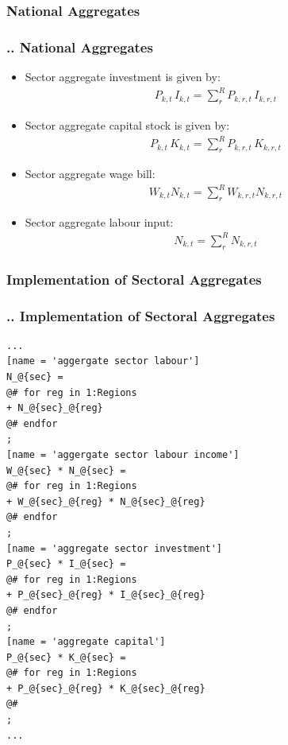 \documentclass[11pt,aspectratio=169]{beamer}
\begin{document}
\subsubsection{National Aggregates}
\begin{frame}
\frametitle{{\thesection.\thesubsection.\thesubsubsection} National Aggregates}
\scriptsize
\begin{itemize}
\item Sector aggregate investment is given by:
\begin{align*}
P_{k,t} \, I_{k,t} = \sum_{r}^{R} P_{k,r,t} \, I_{k,r,t}
\end{align*}
\item Sector aggregate capital stock is given by:
\begin{align*}
P_{k,t} \, K_{k,t} = \sum_{r}^{R} P_{k,r,t} \, K_{k,r,t}
\end{align*}
\item Sector aggregate wage bill:
\begin{align*}
W_{k,t} N_{k,t} = \sum_{r}^{R}  W_{k,r,t} N_{k,r,t}
\end{align*}
\item Sector aggregate labour input:
\begin{align*}
N_{k,t} = \sum_{r}^{R} N_{k,r,t}
\end{align*}
\end{itemize}
\end{frame}

\subsubsection{Implementation of Sectoral Aggregates}
\begin{frame}[fragile]
\frametitle{{\thesection.\thesubsection.\thesubsubsection} Implementation of Sectoral Aggregates}

\begin{lstlisting}[frame = single]
...
[name = 'aggergate sector labour']
N_@{sec} = 
@# for reg in 1:Regions
+ N_@{sec}_@{reg}
@# endfor
;
[name = 'aggergate sector labour income']
W_@{sec} * N_@{sec} = 
@# for reg in 1:Regions
+ W_@{sec}_@{reg} * N_@{sec}_@{reg}
@# endfor
;
[name = 'aggregate sector investment']
P_@{sec} * I_@{sec} = 
@# for reg in 1:Regions
+ P_@{sec}_@{reg} * I_@{sec}_@{reg}
@# endfor
;
[name = 'aggregate capital']
P_@{sec} * K_@{sec} = 
@# for reg in 1:Regions
+ P_@{sec}_@{reg} * K_@{sec}_@{reg}
@#
;
...
\end{lstlisting}
\end{frame}
\end{document}
